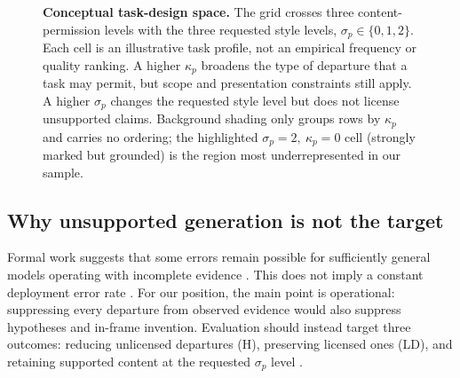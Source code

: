 \documentclass{clv2025}
\newcommand{\LD}{\textsc{LD}}
\newcommand{\Hall}{\textsc{H}}
\begin{document}
\begin{figure}[t]
{}
\caption{\textbf{Conceptual task-design space.}
The grid crosses three content-permission levels with the three requested style levels, $\sigma_p\in\{0,1,2\}$.
Each cell is an illustrative task profile, not an empirical frequency or quality ranking.
A higher $\kappa_p$ broadens the type of departure that a task may permit, but scope and presentation constraints still apply.
A higher $\sigma_p$ changes the requested style level but does not license unsupported claims.
Background shading only groups rows by $\kappa_p$ and carries no ordering; the highlighted $\sigma_p=2,\ \kappa_p=0$ cell (strongly marked but grounded) is the region most underrepresented in our sample.}
\label{fig:profiles}
\end{figure}

\subsection{Why unsupported generation is not the target}

Formal work suggests that some errors remain possible for sufficiently general models operating with incomplete evidence \citep{kalai_calibrated_2024,xu_hallucination_2024,banerjee_llms_2024}.
This does not imply a constant deployment error rate \citep{suzuki_negligible_2025}.
For our position, the main point is operational: suppressing every departure from observed evidence would also suppress hypotheses and in-frame invention.
Evaluation should instead target three outcomes: reducing unlicensed departures (\Hall), preserving licensed ones (\LD), and retaining supported content at the requested $\sigma_p$ level \citep{banerjee_does_2025,sun_hallucinating_2024,he_shakespearean_2025}.
\end{document}
